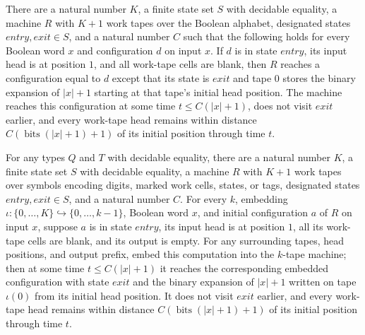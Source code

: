 \begin{theorem}
\label{Turing.rt_exists_boundTM}
\leanok
{}
There are a natural number $K$, a finite state set $S$ with decidable equality, a
machine $R$ with $K+1$ work tapes over the Boolean alphabet, designated states
$entry,exit\in S$, and a natural number $C$ such that the following holds for every
Boolean word $x$ and configuration $d$ on input $x$. If $d$ is in state $entry$, its
input head is at position $1$, and all work-tape cells are blank, then $R$ reaches a
configuration equal to $d$ except that its state is $exit$ and tape $0$ stores the
binary expansion of $|x|+1$ starting at that tape's initial head position. The machine
reaches this configuration at some time $t\le C(|x|+1)$, does not visit $exit$ earlier,
and every work-tape head remains within distance $C(\operatorname{bits}(|x|+1)+1)$ of
its initial position through time $t$.
\end{theorem}

\begin{theorem}
\label{Turing.rt_exists_digitBoundTM}
\leanok
{}
For any types $Q$ and $T$ with decidable equality, there are a natural number $K$, a
finite state set $S$ with decidable equality, a machine $R$ with $K+1$ work tapes over
symbols encoding digits, marked work cells, states, or tags, designated states
$entry,exit\in S$, and a natural number $C$. For every $k$, embedding
$\iota:\{0,\ldots,K\}\hookrightarrow\{0,\ldots,k-1\}$, Boolean word $x$, and initial
configuration $a$ of $R$ on input $x$, suppose $a$ is in state $entry$, its input head
is at position $1$, all its work-tape cells are blank, and its output is empty. For any
surrounding tapes, head positions, and output prefix, embed this computation into the
$k$-tape machine; then at some time $t\le C(|x|+1)$ it reaches the corresponding
embedded configuration with state $exit$ and the binary expansion of $|x|+1$ written on
tape $\iota(0)$ from its initial head position. It does not visit $exit$ earlier, and
every work-tape head remains within distance $C(\operatorname{bits}(|x|+1)+1)$ of its
initial position through time $t$.
\end{theorem}

